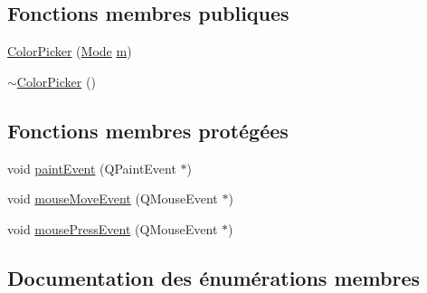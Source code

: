 \subsection*{Fonctions membres publiques}
\begin{DoxyCompactItemize}
\item 
\hyperlink{class_color_picker_af286c2198e135f3d42bf37111be3803b}{Color\+Picker} (\hyperlink{class_color_picker_aedde1e35d1e2d87b4d834b0642db277f}{Mode} \hyperlink{060__command__switch_8tcl_a78d127e8bda64d4471ac811ad512fbd9}{m})
\item 
\hyperlink{class_color_picker_ad431a9537f9fbb350f321abbe92c5f1a}{$\sim$\+Color\+Picker} ()
\end{DoxyCompactItemize}
\subsection*{Fonctions membres protégées}
\begin{DoxyCompactItemize}
\item 
void \hyperlink{class_color_picker_a120d9512f48096256f0db2c67c59e0c6}{paint\+Event} (Q\+Paint\+Event $\ast$)
\item 
void \hyperlink{class_color_picker_a458a9356951e1cd6cd9d765a183d975c}{mouse\+Move\+Event} (Q\+Mouse\+Event $\ast$)
\item 
void \hyperlink{class_color_picker_a48fc5f618b9ef036024e59aa35342a5c}{mouse\+Press\+Event} (Q\+Mouse\+Event $\ast$)
\end{DoxyCompactItemize}


\subsection{Documentation des énumérations membres}
\hypertarget{class_color_picker_aedde1e35d1e2d87b4d834b0642db277f}{}
